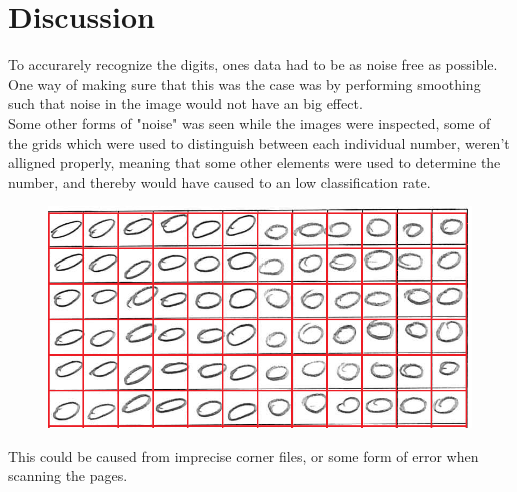 \chapter{Discussion}
To accurarely recognize the digits, ones data had to be as noise free as possible.
One way of making sure that this was the case was by performing smoothing such
that noise in the image would not have an big effect.\\


Some other forms of "noise" was seen while the images were inspected,
some of the grids which were used to distinguish between each individual number,
weren't alligned properly, meaning that some other elements were used to determine the number,
and thereby would have caused to an low classification rate. 


\begin{figure}[H]
\centering
\includegraphics[width  =\textwidth]{figure/kiddi-01-grid-nosmooth-300dpi_cut.png}
\end{figure}

This could be caused from imprecise corner files, or some form of error when scanning the pages. \\



